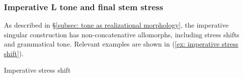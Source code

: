 \subsubsection{Imperative L tone and final stem stress}
\label{subsubsec: imperative final stem stress}


\largerpage
As described in §\ref{subsec: tone as realizational morphology}, the imperative singular construction has non-concatena\-tive allomorphs, including stress shifts and grammatical tone. Relevant examples are shown in (\ref{ex: imperative stress shift}).

\ea\label{ex: imperative stress shift}
{Imperative stress shift}

    \label{ex: imperative stress shifta}
        \label{ex: imperative stress shiftb}
            \label{ex: imperative stress shiftc}
                \label{ex: imperative stress shiftd}
